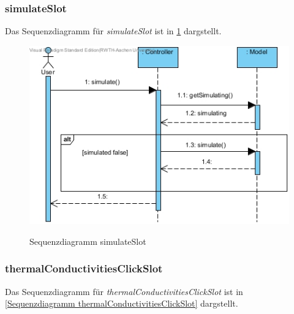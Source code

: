 \subsubsection*{simulateSlot}

Das Sequenzdiagramm für \emph{simulateSlot} ist in \ref{Sequenzdiagramm simulateSlot} dargstellt.

\begin{figure}[H]
	\centering
	\includegraphics[scale=.6]{Bilder/Controller__simulateSlot().jpg}\\
	\caption{Sequenzdiagramm simulateSlot}
	\label{Sequenzdiagramm simulateSlot}
\end{figure}

\subsubsection*{thermalConductivitiesClickSlot}

Das Sequenzdiagramm für \emph{thermalConductivitiesClickSlot} ist in \ref{Sequenzdiagramm thermalConductivitiesClickSlot} dargstellt.

